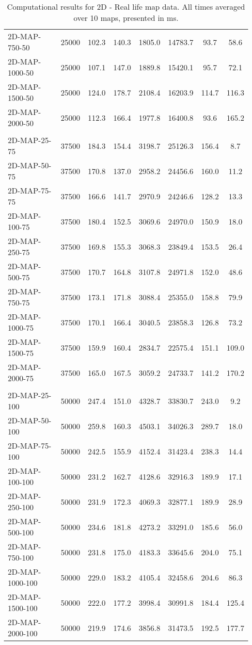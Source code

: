 \documentclass{article}
\begin{document}
\begin{center}
\begin{table}[h]
\begin{tabular}{|l||c|c|c|c|c|c|c|}
    2D-MAP-750-50 & 25000 & 102.3 & 140.3 & 1805.0 & 14783.7 & 93.7 & 58.6 \\
    2D-MAP-1000-50 & 25000 & 107.1 & 147.0 & 1889.8 & 15420.1 & 95.7 & 72.1 \\
    2D-MAP-1500-50 & 25000 & 124.0 & 178.7 & 2108.4 & 16203.9 & 114.7 & 116.3 \\
    2D-MAP-2000-50 & 25000 & 112.3 & 166.4 & 1977.8 & 16400.8 & 93.6 & 165.2 \\
    \hline \\
    2D-MAP-25-75 & 37500 & 184.3 & 154.4 & 3198.7 & 25126.3 & 156.4 & 8.7 \\
    2D-MAP-50-75 & 37500 & 170.8 & 137.0 & 2958.2 & 24456.6 & 160.0 & 11.2 \\
    2D-MAP-75-75 & 37500 & 166.6 & 141.7 & 2970.9 & 24246.6 & 128.2 & 13.3 \\
    2D-MAP-100-75 & 37500 & 180.4 & 152.5 & 3069.6 & 24970.0 & 150.9 & 18.0 \\
    2D-MAP-250-75 & 37500 & 169.8 & 155.3 & 3068.3 & 23849.4 & 153.5 & 26.4 \\
    2D-MAP-500-75 & 37500 & 170.7 & 164.8 & 3107.8 & 24971.8 & 152.0 & 48.6 \\
    2D-MAP-750-75 & 37500 & 173.1 & 171.8 & 3088.4 & 25355.0 & 158.8 & 79.9 \\
    2D-MAP-1000-75 & 37500 & 170.1 & 166.4 & 3040.5 & 23858.3 & 126.8 & 73.2 \\
    2D-MAP-1500-75 & 37500 & 159.9 & 160.4 & 2834.7 & 22575.4 & 151.1 & 109.0 \\
    2D-MAP-2000-75 & 37500 & 165.0 & 167.5 & 3059.2 & 24733.7 & 141.2 & 170.2 \\
    \hline \\
    2D-MAP-25-100 & 50000 & 247.4 & 151.0 & 4328.7 & 33830.7 & 243.0 & 9.2 \\
    2D-MAP-50-100 & 50000 & 259.8 & 160.3 & 4503.1 & 34026.3 & 289.7 & 18.0 \\
    2D-MAP-75-100 & 50000 & 242.5 & 155.9 & 4152.4 & 31423.4 & 238.3 & 14.4 \\
    2D-MAP-100-100 & 50000 & 231.2 & 162.7 & 4128.6 & 32916.3 & 189.9 & 17.1 \\
    2D-MAP-250-100 & 50000 & 231.9 & 172.3 & 4069.3 & 32877.1 & 189.9 & 28.9 \\
    2D-MAP-500-100 & 50000 & 234.6 & 181.8 & 4273.2 & 33291.0 & 185.6 & 56.0 \\
    2D-MAP-750-100 & 50000 & 231.8 & 175.0 & 4183.3 & 33645.6 & 204.0 & 75.1 \\
    2D-MAP-1000-100 & 50000 & 229.0 & 183.2 & 4105.4 & 32458.6 & 204.6 & 86.3 \\
    2D-MAP-1500-100 & 50000 & 222.0 & 177.2 & 3998.4 & 30991.8 & 184.4 & 125.4 \\
    2D-MAP-2000-100 & 50000 & 219.9 & 174.6 & 3856.8 & 31473.5 & 192.5 & 177.7 \\
    \hline
    \end{tabular}
    \caption{Computational results for 2D - Real life map data. All times averaged over 10 maps, presented in ms.}
\end{table}
\end{center}
\restoregeometry
\end{document}
